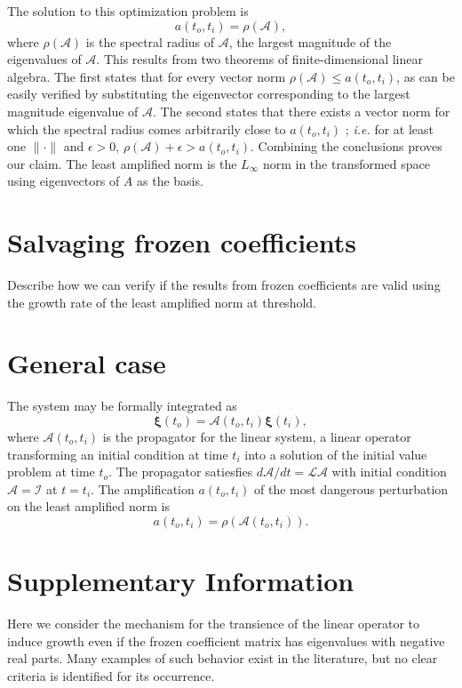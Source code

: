 \documentclass[letterpaper,10pt]{article}
\newcommand{\cL}{\boldsymbol{\mathcal{L}}}
\newcommand{\cA}{\boldsymbol{\mathcal{A}}}
\newcommand{\cI}{\boldsymbol{\mathcal{I}}}
\newcommand{\prt}{\boldsymbol{\xi}}
\newcommand{\nrm}{{\|\cdot\|}}
\newcommand{\obs}{o}
\newcommand{\inc}{i}
\begin{document}
The solution to this optimization problem is 
\begin{equation} \label{eq:RHO}
a(t_\obs,t_\inc) = \rho(\cA),
\end{equation}
where $\rho(\cA)$ is the spectral radius of $\cA$, the largest magnitude of the eigenvalues of $\cA$.  This results from two theorems of finite-dimensional linear algebra.
The first states that for every vector norm $\rho(\cA) \le a(t_\obs,t_\inc)$, as can be easily verified by substituting the eigenvector corresponding to the largest magnitude eigenvalue of $\cA$. 
The second states that there exists a vector norm for which the spectral radius comes arbitrarily close to $a(t_\obs,t_\inc)$ \cite{bulirsch2002introduction}; {\it i.e.} for at least one $\nrm$ and $\epsilon>0$, $\rho (\cA) + \epsilon > a(t_\obs,t_\inc)$. 
Combining the conclusions proves our claim.%
The least amplified norm is the $L_\infty$ norm in the transformed space using eigenvectors of $A$ as the basis.

\section{Salvaging frozen coefficients}
Describe how we can verify if the results from frozen coefficients are valid using the growth rate of the least amplified norm at threshold.

\section{General case}
The system may be formally integrated as
\begin{equation} \label{eq:PROP}
\prt (t_\obs) = \cA(t_\obs, t_\inc) \prt (t_\inc), 
\end{equation}
where $\cA (t_\obs, t_\inc)$ is the propagator for the linear system, a linear operator transforming an initial condition at time $t_\inc$ into a solution of the initial value problem at time $t_\obs$.  
The propagator satiesfies $d\cA/dt = \cL \cA$ with initial condition $\cA=\cI$ at $t=t_\inc$.  
The amplification $a(t_\obs, t_\inc)$ of the most dangerous perturbation on the least amplified norm is 
\begin{equation}
a(t_\obs, t_\inc) = \rho(\cA(t_\obs, t_\inc)).
\end{equation}




\newpage
\section*{Supplementary Information}
\setcounter{page}{1}
Here we consider the mechanism for the transience of the linear operator to induce growth even if the frozen coefficient matrix has eigenvalues with negative real parts. 
Many examples of such behavior exist in the literature, but no clear criteria is identified for its occurrence. 
\end{document}
